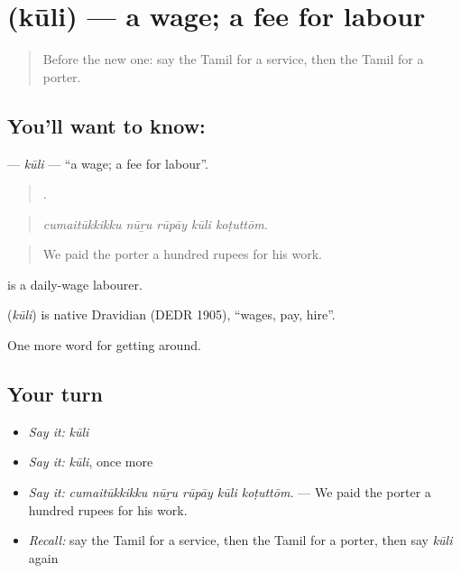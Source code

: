 \section[\texorpdfstring{\ta{கூலி} (kūli)}{கூலி (kūli)}]{ (kūli) — a wage; a fee for labour}

\label{lesson:TA-C420-kuli-wage}



\begin{quote}
Before the new one: say the Tamil for a service, then the Tamil for a porter.
\end{quote}

\subsection*{You'll want to know: }
\textbf{} — \emph{kūli} — \textquotedblleft{}a wage; a fee for labour\textquotedblright{}.

\begin{quote}
    .
\end{quote}

\begin{quote}
\emph{cumaitūkkikku nūṟu rūpāy kūli koṭuttōm.}
\end{quote}

\begin{quote}
We paid the porter a hundred rupees for his work.
\end{quote}

  is a daily-wage labourer.

\begin{cousinweb}
\textbf{} (\emph{kūli}) is native Dravidian (DEDR 1905), \textquotedblleft{}wages, pay, hire\textquotedblright{}.
\end{cousinweb}

\begin{grammarlens}[title={What you've built}]
One more word for getting around.
\end{grammarlens}

\subsection*{Your turn}
\begin{itemize}
\raggedright
  \item \emph{Say it:} \emph{kūli}
  \item \emph{Say it:} \emph{kūli}, once more
  \item \emph{Say it:} \emph{cumaitūkkikku nūṟu rūpāy kūli koṭuttōm.} — We paid the porter a hundred rupees for his work.
  \item \emph{Recall:} say the Tamil for a service, then the Tamil for a porter, then say \emph{kūli} again
\end{itemize}

